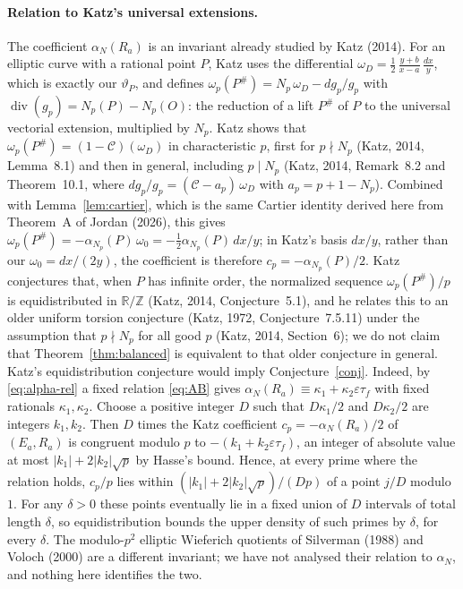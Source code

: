 \documentclass[11pt,a4paper]{article}
\numberwithin{equation}{section}
\theoremstyle{plain}
\theoremstyle{definition}
\newcommand{\Z}{\mathbb{Z}}
\newcommand{\eps}{\varepsilon}
\DeclareMathOperator{\divisor}{div}
\begin{document}
\paragraph{Relation to Katz's universal extensions.} The coefficient $\alpha_N(R_a)$ is an invariant already studied by Katz (2014). For an elliptic curve with a rational point $P$, Katz uses the differential $\omega_D=\tfrac12\,\frac{y+b}{x-a}\,\frac{dx}{y}$, which is exactly our $\vartheta_P$, and defines $\omega_p(P^\#)=N_p\,\omega_D-dg_p/g_p$ with $\divisor(g_p)=N_p(P)-N_p(O)$: the reduction of a lift $P^\#$ of $P$ to the universal vectorial extension, multiplied by $N_p$. Katz shows that $\omega_p(P^\#)=(1-\mathcal C)(\omega_D)$ in characteristic $p$, first for $p\nmid N_p$ (Katz, 2014, Lemma~8.1) and then in general, including $p\mid N_p$ (Katz, 2014, Remark~8.2 and Theorem~10.1, where $dg_p/g_p=(\mathcal C-a_p)\,\omega_D$ with $a_p=p+1-N_p$). Combined with Lemma~\ref{lem:cartier}, which is the same Cartier identity derived here from Theorem~A of Jordan (2026), this gives $\omega_p(P^\#)=-\alpha_{N_p}(P)\,\omega_0=-\tfrac12\alpha_{N_p}(P)\,dx/y$; in Katz's basis $dx/y$, rather than our $\omega_0=dx/(2y)$, the coefficient is therefore $c_p=-\alpha_{N_p}(P)/2$. Katz conjectures that, when $P$ has infinite order, the normalized sequence $\omega_p(P^\#)/p$ is equidistributed in $\mathbb R/\Z$ (Katz, 2014, Conjecture~5.1), and he relates this to an older uniform torsion conjecture (Katz, 1972, Conjecture~7.5.11) under the assumption that $p\nmid N_p$ for all good $p$ (Katz, 2014, Section~6); we do not claim that Theorem~\ref{thm:balanced} is equivalent to that older conjecture in general. Katz's equidistribution conjecture would imply Conjecture~\ref{conj}. Indeed, by \eqref{eq:alpha-rel} a fixed relation \eqref{eq:AB} gives $\alpha_N(R_a)\equiv\kappa_1+\kappa_2\eps\tau_f$ with fixed rationals $\kappa_1,\kappa_2$. Choose a positive integer $D$ such that $D\kappa_1/2$ and $D\kappa_2/2$ are integers $k_1,k_2$. Then $D$ times the Katz coefficient $c_p=-\alpha_N(R_a)/2$ of $(E_a,R_a)$ is congruent modulo $p$ to $-(k_1+k_2\eps\tau_f)$, an integer of absolute value at most $|k_1|+2|k_2|\sqrt p$ by Hasse's bound. Hence, at every prime where the relation holds, $c_p/p$ lies within $(|k_1|+2|k_2|\sqrt p)/(Dp)$ of a point $j/D$ modulo $1$. For any $\delta>0$ these points eventually lie in a fixed union of $D$ intervals of total length $\delta$, so equidistribution bounds the upper density of such primes by $\delta$, for every $\delta$. The modulo-$p^2$ elliptic Wieferich quotients of Silverman (1988) and Voloch (2000) are a different invariant; we have not analysed their relation to $\alpha_N$, and nothing here identifies the two.
\end{document}
